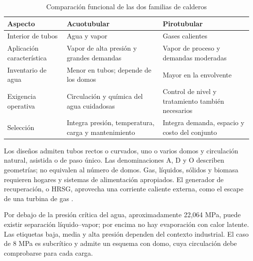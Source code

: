 \documentclass[conference,a4paper,11pt]{IEEEtran}
\begin{document}
\begin{table}[t]
\caption{Comparación funcional de las dos familias de calderos}
\label{tab:comparacion}
\centering\small
\begin{tabular}{>{\raggedright\arraybackslash}p{}>{\raggedright\arraybackslash}p{}>{\raggedright\arraybackslash}p{}}
\toprule
Aspecto & Acuotubular & Pirotubular\\
\midrule
Interior de tubos & Agua y vapor & Gases calientes\\
Aplicación característica & Vapor de alta presión y grandes demandas & Vapor de proceso y demandas moderadas\\
Inventario de agua & Menor en tubos; depende de los domos & Mayor en la envolvente\\
Exigencia operativa & Circulación y química del agua cuidadosas & Control de nivel y tratamiento también necesarios\\
Selección & Integra presión, temperatura, carga y mantenimiento & Integra demanda, espacio y costo del conjunto\\
\bottomrule
\end{tabular}
\end{table}

Los diseños admiten tubos rectos o curvados, uno o varios domos y circulación natural, asistida o de paso único. Las denominaciones A, D y O describen geometrías; no equivalen al número de domos. Gas, líquidos, sólidos y biomasa requieren hogares y sistemas de alimentación apropiados. El generador de recuperación, o HRSG, aprovecha una corriente caliente externa, como el escape de una turbina de gas \cite{epa}.

Por debajo de la presión crítica del agua, aproximadamente 22,064 MPa, puede existir separación líquido--vapor; por encima no hay evaporación con calor latente. Las etiquetas baja, media y alta presión dependen del contexto industrial. El caso de 8 MPa es subcrítico y admite un esquema con domo, cuya circulación debe comprobarse para cada carga.
\end{document}
